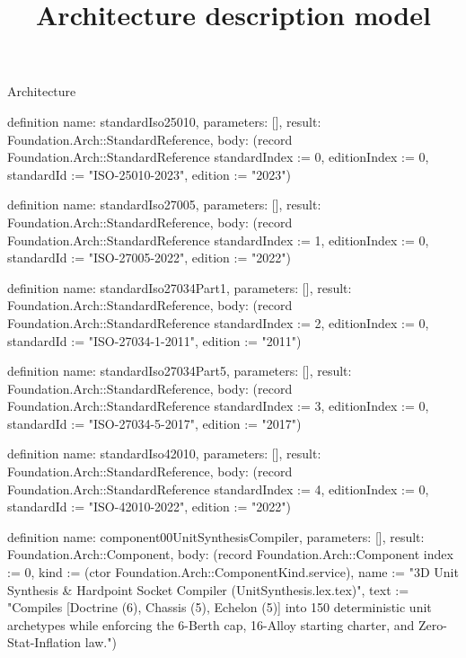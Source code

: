 \begin{lexlean}{Architecture}
\title{Architecture description model}
\begin{semanticmodule}
definition{
  name: standardIso25010,
  parameters: [],
  result: Foundation.Arch::StandardReference,
  body: (record Foundation.Arch::StandardReference {standardIndex := 0, editionIndex := 0, standardId := "ISO-25010-2023", edition := "2023"})
}

definition{
  name: standardIso27005,
  parameters: [],
  result: Foundation.Arch::StandardReference,
  body: (record Foundation.Arch::StandardReference {standardIndex := 1, editionIndex := 0, standardId := "ISO-27005-2022", edition := "2022"})
}

definition{
  name: standardIso27034Part1,
  parameters: [],
  result: Foundation.Arch::StandardReference,
  body: (record Foundation.Arch::StandardReference {standardIndex := 2, editionIndex := 0, standardId := "ISO-27034-1-2011", edition := "2011"})
}

definition{
  name: standardIso27034Part5,
  parameters: [],
  result: Foundation.Arch::StandardReference,
  body: (record Foundation.Arch::StandardReference {standardIndex := 3, editionIndex := 0, standardId := "ISO-27034-5-2017", edition := "2017"})
}

definition{
  name: standardIso42010,
  parameters: [],
  result: Foundation.Arch::StandardReference,
  body: (record Foundation.Arch::StandardReference {standardIndex := 4, editionIndex := 0, standardId := "ISO-42010-2022", edition := "2022"})
}

definition{
  name: component00UnitSynthesisCompiler,
  parameters: [],
  result: Foundation.Arch::Component,
  body: (record Foundation.Arch::Component {index := 0, kind := (ctor Foundation.Arch::ComponentKind.service), name := "3D Unit Synthesis & Hardpoint Socket Compiler (UnitSynthesis.lex.tex)", text := "Compiles [Doctrine (6), Chassis (5), Echelon (5)] into 150 deterministic unit archetypes while enforcing the 6-Berth cap, 16-Alloy starting charter, and Zero-Stat-Inflation law."})
}


\end{semanticmodule}
\end{lexlean}
